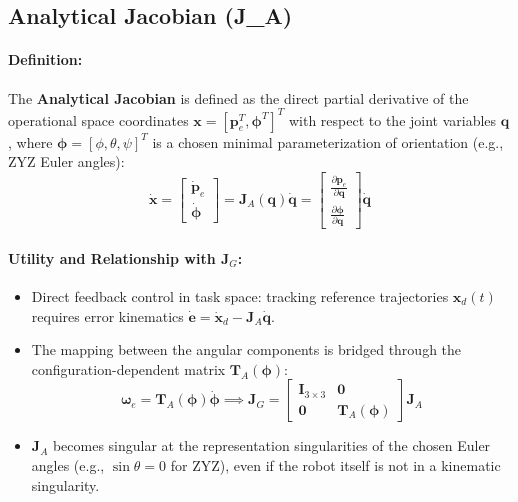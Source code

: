 \documentclass[11pt, a4paper]{article}
\begin{document}
\subsection{Analytical Jacobian (J\_A)}
\paragraph{Definition:} The \textbf{Analytical Jacobian} is defined as the direct partial derivative of the operational space coordinates $\mathbf{x} = [\mathbf{p}_e^T, \boldsymbol{\phi}^T]^T$ with respect to the joint variables $\mathbf{q}$, where $\boldsymbol{\phi} = [\phi, \theta, \psi]^T$ is a chosen minimal parameterization of orientation (e.g., ZYZ Euler angles):
\begin{equation}
    \mathbf{\dot{x}} = \begin{bmatrix} \mathbf{\dot{p}}_e \\ \boldsymbol{\dot{\phi}} \end{bmatrix} = \mathbf{J}_A(\mathbf{q})\mathbf{\dot{q}} = 
    \begin{bmatrix} \frac{\partial \mathbf{p}_e}{\partial \mathbf{q}} \\[6pt] \frac{\partial \boldsymbol{\phi}}{\partial \mathbf{q}} \end{bmatrix}\mathbf{\dot{q}}
\end{equation}

\paragraph{Utility and Relationship with $\mathbf{J}_G$:}
\begin{itemize}
    \item Direct feedback control in task space: tracking reference trajectories $\mathbf{x}_d(t)$ requires error kinematics $\mathbf{\dot{e}} = \mathbf{\dot{x}}_d - \mathbf{J}_A\mathbf{\dot{q}}$.
    \item The mapping between the angular components is bridged through the configuration-dependent matrix $\mathbf{T}_A(\boldsymbol{\phi})$:
    \begin{equation}
        \boldsymbol{\omega}_e = \mathbf{T}_A(\boldsymbol{\phi})\boldsymbol{\dot{\phi}} \implies 
        \mathbf{J}_G = \begin{bmatrix} \mathbf{I}_{3\times 3} & \mathbf{0} \\ \mathbf{0} & \mathbf{T}_A(\boldsymbol{\phi}) \end{bmatrix}\mathbf{J}_A
    \end{equation}
    \item $\mathbf{J}_A$ becomes singular at the representation singularities of the chosen Euler angles (e.g., $\sin\theta = 0$ for ZYZ), even if the robot itself is not in a kinematic singularity.
\end{itemize}
\end{document}
